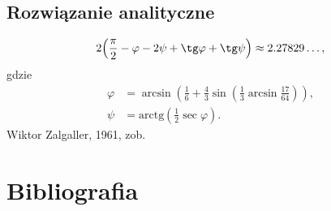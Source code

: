 \documentclass[aspectratio=169]{beamer}
\newcommand{\arctg}{\mathrm{arctg}}
\newcommand{\paren}[1]{\!\left(#1 \right)}
\begin{document}
\begin{frame}
  \begin{figure}
    	{\escapeFromStripConvPlotTex}
  \end{figure}
\end{frame}

\subsection{Rozwiązanie analityczne}

\begin{frame}
\begin{equation*}
2\paren{\frac{\pi}{2}-\varphi-2\psi+\tg\varphi+\tg\psi} \approx 2.27829\ldots,
\end{equation*}
gdzie
\begin{align*}
  \varphi &= \arcsin\paren{\frac{1}{6}+\frac{4}{3}\sin\paren{\frac{1}{3}\arcsin\frac{17}{64}}}, \\
  \psi &= \arctg\paren{\frac{1}{2}\sec\varphi}.
\end{align*}
\pause{}
Wiktor Zalgaller, 1961, zob.~\cite{Finch2019b}
\end{frame}

\section{Bibliografia}
\begin{frame}[allowframebreaks]
  {}
  
\end{frame}
\end{document}
